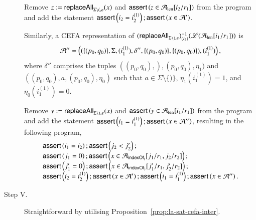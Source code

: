 \begin{example}
\begin{description}
Remove  $z:= \mathsf{replaceAll}_{\Sigma \setminus (, \varepsilon}(x)$ and $\textsf{assert}\left(z \in \mathcal{A}_{\rm len}[i_2/r_1]\right)$ from the program and add the statement $\textsf{assert}\left(i_2=i^{(1)}_2\right);\textsf{assert}\left(x \in \mathcal{A}'\right)$. 

Similarly, a CEFA representation of $(\mathsf{replaceAll}_{\Sigma \setminus ), \varepsilon})^{-1}_{(i_2)}(\mathscr{L}(\mathcal{A}_{\rm len}[i_1/r_1]))$ is  
\[\mathcal{A}'' = \left((\{(p_0, q_0)\}, \Sigma, (i^{(1)}_1), \delta'', \{(p_0, q_0)\}, \{(p_0, q_0)\}), (i^{(1)}_1)\right),\]
%
where $\delta''$ comprises the tuples $((p_0,q_0), ), (p_0,q_0), \eta_1)$ and $((p_0,q_0), a, (p_0,q_0), \eta_0)$ such that $a \in \Sigma \setminus \{)\}$, $\eta_1(i^{(1)}_1)=1$, and $\eta_0(i^{(1)}_1)=0$. 

Remove  $y:= \mathsf{replaceAll}_{\Sigma \setminus ), \varepsilon}(x)$ and $\textsf{assert}\left(y \in \mathcal{A}_{\rm len}[i_1/r_1]\right)$ from the program and add the statement $\textsf{assert}\left(i_1=i^{(1)}_1\right); \textsf{assert}\left(x \in \mathcal{A}''\right)$, resulting in the following program,
\[
\begin{array}{l}
\textsf{assert}\left(i_1 = i_2\right); \textsf{assert}\left( j_2 < j'_2\right);\\
\textsf{assert}\left(j_1 = 0\right); \textsf{assert}\left(x \in \mathcal{A}_{\mathsf{indexOf}_{(}}[j_1/r_1, j_2/r_2]\right);  \\
\textsf{assert}\left(j'_1 = 0\right); \textsf{assert}\left(x \in \mathcal{A}_{\mathsf{indexOf}_{)}}[j'_1/r_1, j'_2/r_2]\right);\\
\textsf{assert}\left(i_2=i^{(1)}_2\right); \textsf{assert}\left(x \in \mathcal{A}'\right); \textsf{assert}\left(i_1=i^{(1)}_1\right); \textsf{assert}\left(x \in \mathcal{A}''\right).
\end{array}
\] 
%
\item[Step V.]  Straightforward by utilising Proposition~\ref{prop:la-sat-cefa-inter}. 
\end{description}

\end{example}





